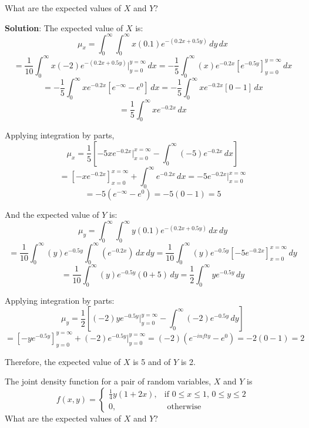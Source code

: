 What are the expected values of $X$ and $Y$?

\textbf{Solution}: The expected value of $X$ is:
$$\mu_x = \int_0^{\infty} \int_0^{\infty} x(0.1)e^{-(0.2x + 0.5y)}\,dy\,dx$$
$$= \frac{1}{10} \int_0^{\infty} x \left(-2 \right) e^{-(0.2x + 0.5y)}|_{y = 0}
^{y = \infty}\,dx = -\frac{1}{5} \int_0^{\infty} (x)e^{-0.2x} \left[ e^{-0.5y} 
\right]_{y = 0}^{y = \infty}\,dx$$
$$= -\frac{1}{5} \int_0^{\infty} xe^{-0.2x} \left[ e^{-\infty} - e^0 \right]
\,dx = -\frac{1}{5} \int_0^{\infty} xe^{-0.2x} \left[0 - 1 \right]\,dx $$
$$= \frac{1}{5} \int_0^{\infty} xe^{-0.2x}\,dx$$

Applying integration by parts, 
$$\mu_x = \frac{1}{5} \left[ -5xe^{-0.2x}|_{x = 0}^{x = \infty} - \int_0^{
\infty} (-5)e^{-0.2x}\,dx \right]$$
$$= \left[-xe^{-0.2x} \right]_{x = 0}^{x = \infty} + \int_0^{\infty} e^{-0.2x}
\,dx  = -5e^{-0.2x}|_{x = 0}^{x = \infty}$$
$$= -5 \left(e^{-\infty} - e^0 \right) = -5 \left(0 - 1 \right) = 5$$

And the expected value of $Y$ is:
$$\mu_y = \int_0^{\infty} \int_0^{\infty} y(0.1)e^{-(0.2x + 0.5y)}\,dx\,dy$$
$$= \frac{1}{10} \int_0^{\infty} (y)e^{-0.5y} \int_0^{\infty} \left(e^{-0.2x} 
\right)\,dx\,dy = \frac{1}{10} \int_0^{\infty} (y)e^{-0.5y} \left[ -5e^{-0.2x} 
\right]_{x = 0}^{x = \infty}\,dy$$
$$= \frac{1}{10} \int_0^{\infty} (y)e^{-0.5y} \left(0 + 5 \right)\,dy = \frac{
1}{2} \int_0^{\infty} ye^{-0.5y}\,dy$$

Applying integration by parts:
$$\mu_y = \frac{1}{2} \left[(-2)ye^{-0.5y}|_{y = 0}^{y = \infty} - \int_0^{
\infty} (-2)e^{-0.5y}\,dy \right]$$
$$= \left[-ye^{-0.5y} \right]_{y = 0}^{y = \infty} + (-2)e^{-0.5y}|_{y = 0}^{y 
= \infty} = (-2) \left( e^{-infty} - e^0 \right) = -2(0 - 1) = 2$$

Therefore, the expected value of $X$ is 5 and of $Y$ is 2. 

\begin{Exercise}[title = {Expected Values}, label = expect]
The joint density function for a pair of random variables, $X$ and $Y$ is
$$f(x, y) = 
\begin{cases}
	\frac{1}{4} y (1 + 2x),& \text{if } 0 \leq x \leq 1\text{, }0 \leq y \leq 2\\
	0,&\text{ otherwise}
\end{cases}$$
What are the expected values of $X$ and $Y$?
\vspace{75mm}
\end{Exercise}

